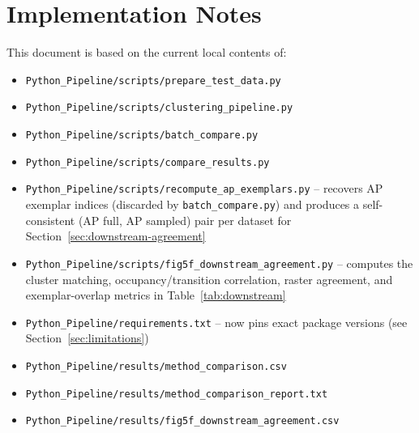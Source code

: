 \documentclass[11pt]{article}
\begin{document}
\section*{Implementation Notes}

This document is based on the current local contents of:

\begin{itemize}
    \item \texttt{Python\_Pipeline/scripts/prepare\_test\_data.py}
    \item \texttt{Python\_Pipeline/scripts/clustering\_pipeline.py}
    \item \texttt{Python\_Pipeline/scripts/batch\_compare.py}
    \item \texttt{Python\_Pipeline/scripts/compare\_results.py}
    \item \texttt{Python\_Pipeline/scripts/recompute\_ap\_exemplars.py} -- recovers AP exemplar indices (discarded by \texttt{batch\_compare.py}) and produces a self-consistent (AP full, AP sampled) pair per dataset for Section~\ref{sec:downstream-agreement}
    \item \texttt{Python\_Pipeline/scripts/fig5f\_downstream\_agreement.py} -- computes the cluster matching, occupancy/transition correlation, raster agreement, and exemplar-overlap metrics in Table~\ref{tab:downstream}
    \item \texttt{Python\_Pipeline/requirements.txt} -- now pins exact package versions (see Section~\ref{sec:limitations})
    \item \texttt{Python\_Pipeline/results/method\_comparison.csv}
    \item \texttt{Python\_Pipeline/results/method\_comparison\_report.txt}
    \item \texttt{Python\_Pipeline/results/fig5f\_downstream\_agreement.csv}
\end{itemize}
\end{document}
